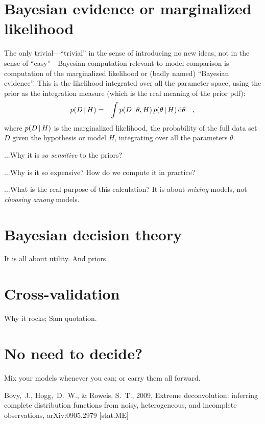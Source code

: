 \documentclass[12pt,twoside]{article}
\newcommand{\data}{D}
\newcommand{\pars}{\theta}
\begin{document}
\section{Bayesian evidence or marginalized likelihood}

The only trivial---``trivial'' in the sense of introducing no new
ideas, not in the sense of ``easy''---Bayesian computation
relevant to model comparison is computation of the marginalized
likelihood or (badly named) ``Bayesian evidence''.  This is the likelihood
integrated over all the parameter space, using the prior as the
integration measure (which is the real meaning of the prior
pdf):
\begin{eqnarray}
p(\data\given H) &=& \int p(\data\given\pars, H)\,p(\pars\given H)\,\dd\pars
\quad,
\end{eqnarray}
where $p(\data\given H)$ is the marginalized likelihood, the
probability of the full data set $\data$ given the hypothesis or model
$H$, integrating over all the parameters $\pars$.

...Why it is \emph{so sensitive} to the priors?

...Why is it so expensive?  How do we compute it in practice?

...What is the real purpose of this calculation?  It is about
\emph{mixing} models, not \emph{choosing among} models.

\section{Bayesian decision theory}

It is all about utility.  And priors.

\section{Cross-validation}

Why it rocks; Sam quotation.

\section{No need to decide?}

Mix your models whenever you can; or carry them all forward.

\clearpage
{}\theendnotes

\clearpage
\begin{thebibliography}{}
  Bovy,~J., Hogg,~D.~W., \& Roweis, S.~T., 2009,
  Extreme deconvolution: inferring complete distribution functions from noisy, heterogeneous, and incomplete observations, 
  arXiv:0905.2979 [stat.ME]
\end{thebibliography}
\end{document}
